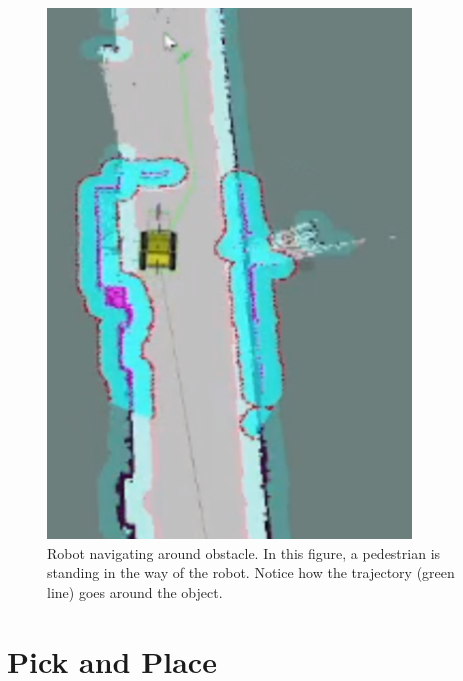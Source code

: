 \begin{figure}[H]
\begin{minipage}[b]{0.49\textwidth}
    \includegraphics[width = 0.86\textwidth]{Figures/figUiaCollisionAvoid4.png}
    \caption{Robot navigating around obstacle. In this figure, a pedestrian is standing in the way of the robot. Notice how the trajectory (green line) goes around the object.}
    \label{fig:R:AN:N:CA:collisionAvoidance2}
  \end{minipage}
\end{figure}

\section{Pick and Place} \label{R:PickAndPlace}



